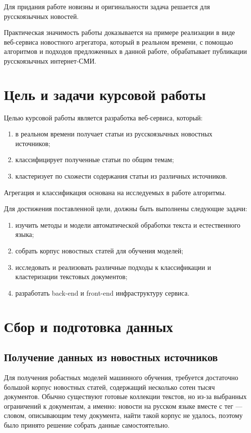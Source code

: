 \documentclass[a4paper, 14pt]{extarticle}
\begin{document}
Для придания работе новизны и оригинальности задача решается для русскоязычных новостей.

Практическая значимость работы доказывается на примере реализации в виде веб-сервиса новостного агрегатора,
который в реальном времени, с помощью алгоритмов и подходов предложенных в данной работе,
обрабатывает публикации русскоязычных интернет-СМИ.

\section{Цель и задачи курсовой работы}
Целью курсовой работы является разработка веб-сервиса, который:
\begin{enumerate}
	\item в реальном времени получает статьи из русскоязычных новостных источников;
	\item классифицирует полученные статьи по общим темам;
	\item кластеризует по схожести содержания статьи из различных источников.
\end{enumerate}
Агрегация и классификация основана на исследуемых в работе алгоритмы.

Для достижения поставленной цели, должны быть выполнены следующие задачи:
\begin{enumerate}
	\item изучить методы и модели автоматической обработки текста и естественного языка;
	\item собрать корпус новостных статей для обучения моделей;
	\item исследовать и реализовать различные подходы к классификации и кластеризации текстовых документов;
	\item разработать back-end и front-end инфраструктуру сервиса.
\end{enumerate}

\section{Сбор и подготовка данных}
\subsection{Получение данных из новостных источников}
Для получения робастных моделей машинного обучения, требуется достаточно большой корпус новостных статей,
содержащий несколько сотен тысяч документов. Обычно существуют готовые коллекции текстов, но из-за выбранных 
ограничений к документам, а именно: новости на русском языке вместе с тег --- словом, описывающим тему 
документа, найти такой корпус не удалось, поэтому было принято решение собрать данные самостоятельно.
\end{document}
